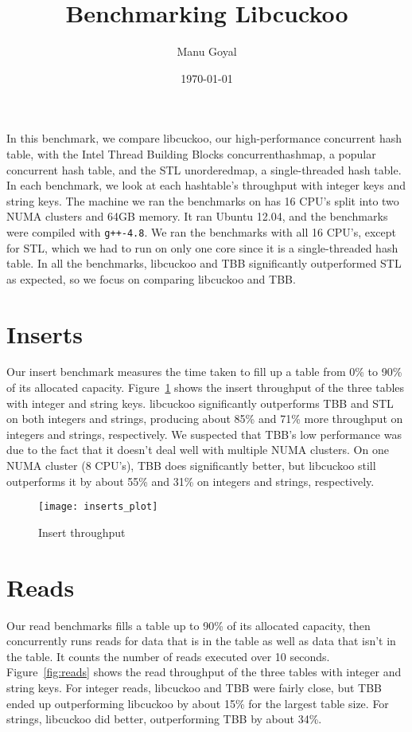 \documentclass[12pt, letterpaper]{article}
\title{Benchmarking Libcuckoo}
\author{Manu Goyal}
\date{\today}
\newcommand{\myfigwidth}{0.8\textwidth}
\begin{document}
\maketitle

In this benchmark, we compare libcuckoo, our high-performance
concurrent hash table, with the Intel Thread Building Blocks
{concurrent\textunderscore hash\textunderscore map}, a popular
concurrent hash table, and the STL {unordered\textunderscore map}, a
single-threaded hash table. In each benchmark, we look at each
hashtable's throughput with integer keys and string keys. The machine
we ran the benchmarks on has 16 CPU's split into two NUMA clusters and
64GB memory. It ran Ubuntu 12.04, and the benchmarks were compiled
with \texttt{g++-4.8}. We ran the benchmarks with all 16 CPU's, except
for STL, which we had to run on only one core since it is a
single-threaded hash table. In all the benchmarks, libcuckoo and TBB
significantly outperformed STL as expected, so we focus on comparing
libcuckoo and TBB.

\section{Inserts}
\label{sec:inserts}

Our insert benchmark measures the time taken to fill up a table from
0\% to 90\% of its allocated capacity. Figure~\ref{fig:inserts} shows
the insert throughput of the three tables with integer and string
keys. libcuckoo significantly outperforms TBB and STL on both integers
and strings, producing about 85\% and 71\% more throughput on integers
and strings, respectively. We suspected that TBB's low performance was
due to the fact that it doesn't deal well with multiple NUMA clusters.
On one NUMA cluster (8 CPU's), TBB does significantly better, but
libcuckoo still outperforms it by about 55\% and 31\% on integers and
strings, respectively.

\begin{figure}
  \centering
  \texttt{[image: inserts\_plot]}
  \caption{Insert throughput}
  \label{fig:inserts}
\end{figure}

\section{Reads}
\label{sec:reads}

Our read benchmarks fills a table up to 90\% of its allocated
capacity, then concurrently runs reads for data that is in the table
as well as data that isn't in the table. It counts the number of reads
executed over 10 seconds. Figure~\ref{fig:reads} shows the read
throughput of the three tables with integer and string keys. For
integer reads, libcuckoo and TBB were fairly close, but TBB ended up
outperforming libcuckoo by about 15\% for the largest table size. For
strings, libcuckoo did better, outperforming TBB by about 34\%.
\end{document}

